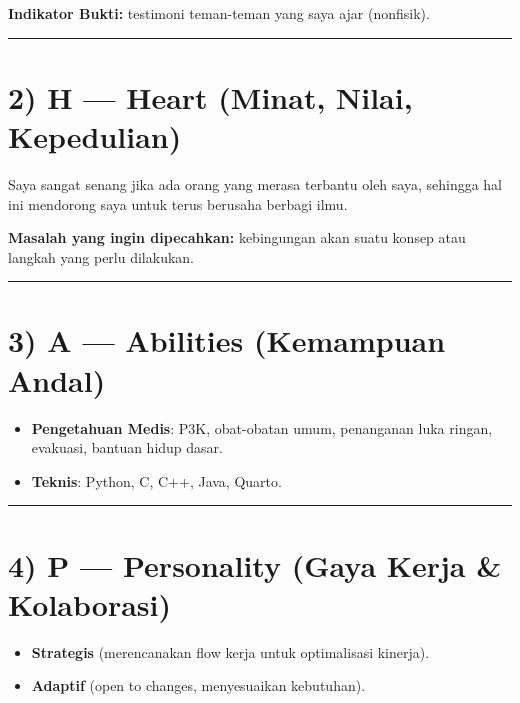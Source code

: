 \documentclass[
  letterpaper,
  DIV=11,
  numbers=noendperiod]{scrreprt}
\providecommand{\tightlist}{%
  \setlength{\itemsep}{0pt}\setlength{\parskip}{0pt}}\usepackage{longtable,booktabs,array}
\begin{document}
\textbf{Indikator Bukti:} testimoni teman-teman yang saya ajar
(nonfisik).

\begin{center}\rule{0.5\linewidth}{0.5pt}\end{center}

\section{2) H --- Heart (Minat, Nilai,
Kepedulian)}\label{h-heart-minat-nilai-kepedulian}

Saya sangat senang jika ada orang yang merasa terbantu oleh saya,
sehingga hal ini mendorong saya untuk terus berusaha berbagi ilmu.

\textbf{Masalah yang ingin dipecahkan:} kebingungan akan suatu konsep
atau langkah yang perlu dilakukan.

\begin{center}\rule{0.5\linewidth}{0.5pt}\end{center}

\section{3) A --- Abilities (Kemampuan
Andal)}\label{a-abilities-kemampuan-andal}

\begin{itemize}
\tightlist
\item
  \textbf{Pengetahuan Medis}: P3K, obat-obatan umum, penanganan luka
  ringan, evakuasi, bantuan hidup dasar.
\item
  \textbf{Teknis}: Python, C, C++, Java, Quarto.
\end{itemize}

\begin{center}\rule{0.5\linewidth}{0.5pt}\end{center}

\section{4) P --- Personality (Gaya Kerja \&
Kolaborasi)}\label{p-personality-gaya-kerja-kolaborasi}

\begin{itemize}
\tightlist
\item
  \textbf{Strategis} (merencanakan flow kerja untuk optimalisasi
  kinerja).
\item
  \textbf{Adaptif} (open to changes, menyesuaikan kebutuhan).
\end{itemize}
\end{document}
